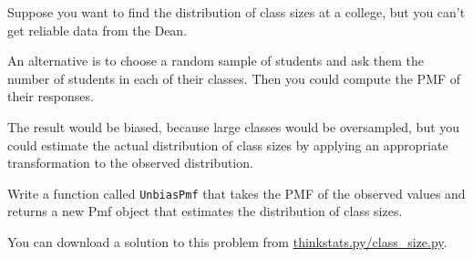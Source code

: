 \documentclass[12pt]{book}
\begin{document}
\begin{ex}

Suppose you want to find the distribution of class sizes at a college,
but you can't get reliable data from the Dean.

An alternative is to choose a random sample of students and ask them
the number of students in each of their classes.  Then you could compute
the PMF of their responses.

The result would be biased, because large classes
would be oversampled, but you could estimate the actual
distribution of class sizes by applying an appropriate transformation
to the observed distribution.

Write a function called \verb"UnbiasPmf" that takes the PMF of the
observed values and returns a new Pmf object that estimates the
distribution of class sizes.

You can download a solution to this problem from
\url{thinkstats.py/class_size.py}.

\end{ex}
\end{document}
